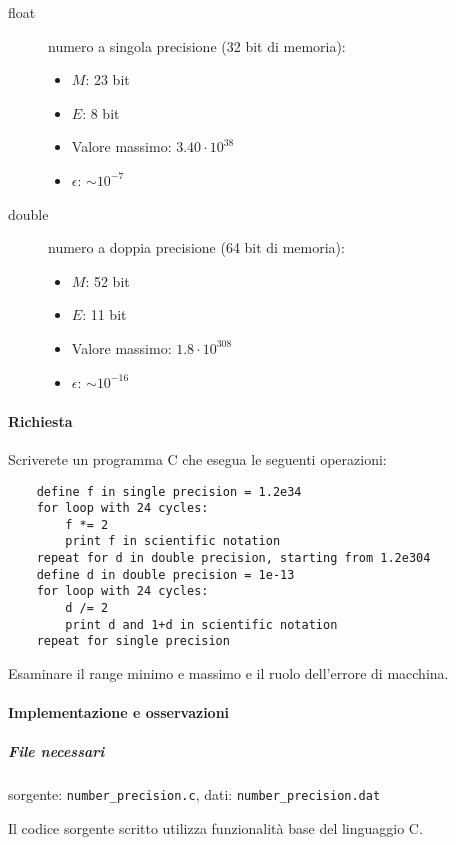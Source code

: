 \begin{description}
	\item[float] numero a singola precisione (32 bit di memoria):
		\begin{itemize}
			\item $M$: 23 bit
			\item $E$: 8 bit
			\item Valore massimo: $3.40 \cdot 10^{38}$
			\item $\epsilon$: $\sim 10^{-7}$
		\end{itemize}
	\item[double] numero a doppia precisione (64 bit di memoria):
		\begin{itemize}
			\item $M$: 52 bit
			\item $E$: 11 bit
			\item Valore massimo: $1.8 \cdot 10^{308}$
			\item $\epsilon$: $\sim 10^{-16}$
		\end{itemize}

\end{description}

\paragraph{Richiesta} Scriverete un programma C che esegua le seguenti operazioni:

\begin{lstlisting}
    define f in single precision = 1.2e34
    for loop with 24 cycles:
        f *= 2
        print f in scientific notation
    repeat for d in double precision, starting from 1.2e304
    define d in double precision = 1e-13
    for loop with 24 cycles:
        d /= 2
        print d and 1+d in scientific notation
    repeat for single precision
\end{lstlisting}

Esaminare il range minimo e massimo e il ruolo dell'errore di macchina.

\paragraph{Implementazione e osservazioni}

\subparagraph{File necessari} sorgente: \texttt{number\_precision.c}, dati: \texttt{number\_precision.dat}

Il codice sorgente scritto utilizza funzionalità base del linguaggio C. 

